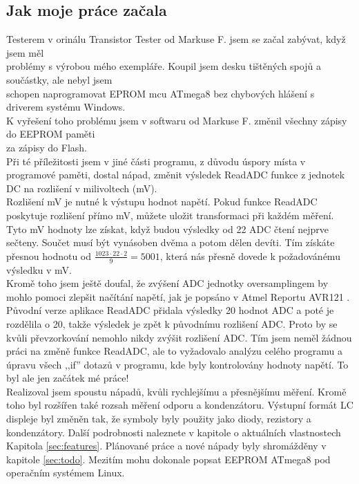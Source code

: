 \subsection*{Jak moje práce začala}
Testerem v orinálu Transistor Tester od Markuse F. \cite{Frejek} jsem se začal zabývat, když jsem měl
\\problémy s výrobou mého exempláře. Koupil jsem desku tištěných spojů a součástky, ale nebyl jsem
\\schopen naprogramovat EPROM mcu ATmega8 bez chybových hlášení s driverem systému Windows.
\\K vyřešení toho problému jsem v softwaru od Markuse F. změnil všechny zápisy do EEPROM paměti
\\za zápisy do Flash.
\\Při té příležitosti jsem v jiné části programu, z důvodu úspory místa v programové paměti, dostal nápad, změnit výsledek ReadADC funkce z jednotek DC  na rozlišení v milivoltech (mV).
\\Rozlišení mV je nutné k výstupu hodnot napětí. Pokud funkce ReadADC poskytuje rozlišení přímo mV, můžete uložit transformaci při každém měření.
Tyto mV hodnoty lze získat, když budou výsledky od 22 ADC čtení nejprve sečteny.
Součet musí být vynásoben dvěma a potom dělen devíti.
Tím získáte přesnou hodnotu od \begin{math}\frac{1023\cdot22\cdot2}{9} = 5001\end{math},
která nás přesně dovede k požadovánému výsledku v mV.\\
Kromě toho jsem ještě doufal, že zvýšení ADC jednotky oversamplingem by mohlo
pomoci zlepšit načítání napětí, jak je popsáno v Atmel Reportu AVR121 \cite{AVR121}.
Původní verze aplikace ReadADC přidala výsledky 20 hodnot ADC a poté je rozdělila o 20,
takže výsledek je zpět k původnímu rozlišení ADC. Proto by se kvůli převzorkování
nemohlo nikdy zvýšit rozlišení ADC.
Tím jsem neměl žádnou práci na změně funkce ReadADC, ale to vyžadovalo analýzu celého programu
a úpravu všech ,,if'' dotazů v programu, kde byly kontrolovány hodnoty napětí.
To byl ale jen začátek mé práce!\\
Realizoval jsem spoustu nápadů, kvůli rychlejšímu a přesnějšímu měření. Kromě toho byl rozšířen také rozsah měření odporu a kondenzátoru. Výstupní formát LC displeje byl změněn tak, že symboly byly použity jako diody, rezistory a kondenzátory. Další podrobnosti naleznete v kapitole o aktuálních vlastnostech Kapitola \ref{sec:features}. 
Plánované práce a nové nápady byly shromážděny v kapitole \ref{sec:todo}.
Mezitím mohu dokonale popsat EEPROM ATmega8 pod operačním systémem Linux.

